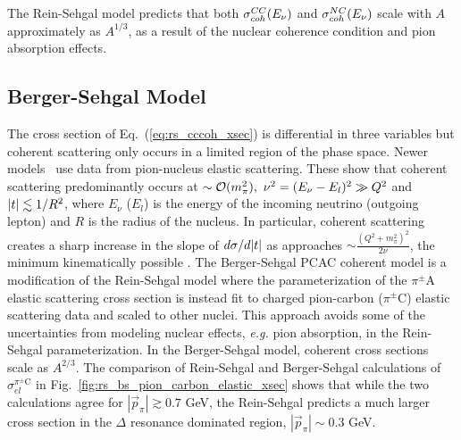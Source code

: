 The Rein-Sehgal model predicts that both $\sigma_{coh}^{CC}(E_{\nu})$ and $\sigma_{coh}^{NC}(E_{\nu})$
scale with $A$ approximately as $A^{1/3}$, as a result of the nuclear coherence condition and pion absorption effects.



\subsection{Berger-Sehgal Model}
\label{sec::Berger-Sehgal}

The cross section of Eq.~(\ref{eq:rs_cccoh_xsec}) is differential in three variables but coherent scattering only occurs in
a limited region of the phase space.  Newer models~\cite{bib:berger_sehgal, bib:kartavtsev, bib:manny} use data from pion-nucleus
elastic scattering.  These show that coherent scattering predominantly occurs at \qsq$\sim\mathcal{O}(m_\pi^2), ~\nu^2 = (E_\nu - E_l)^2 \gg Q^{2}$
and $|t|\lesssim 1/R^2$, where $E_\nu$ ($E_l$) is the energy of the incoming neutrino (outgoing lepton) and $R$ is the radius of the nucleus.
In particular, coherent scattering creates a sharp increase in the slope of $d\sigma/d|t|$ as \tabs approaches
\tmin$\sim \frac{ (Q^2+m_\pi^2)^2}{2\nu}$, the minimum kinematically possible \tabs.
The Berger-Sehgal PCAC coherent model \cite{bib:berger_sehgal} is a modification of the Rein-Sehgal model where the
parameterization of the $\pi^{\pm}$A elastic scattering cross section is instead fit to charged pion-carbon ($\pi^{\pm}$C)
elastic scattering data and scaled to other nuclei.  This approach avoids some of the uncertainties from modeling nuclear effects,
\textit{e.g.} pion absorption, in the Rein-Sehgal parameterization.  In the Berger-Sehgal model, coherent cross sections scale
as $A^{2/3}$.
The comparison of Rein-Sehgal and Berger-Sehgal calculations of $\sigma_{el}^{\pi^{\pm}\text{C}}$ in
Fig.~\ref{fig:rs_bs_pion_carbon_elastic_xsec} shows that while the two calculations agree for $|\vec{p}_{\pi}|\gtrsim0.7$ GeV,
the Rein-Sehgal predicts a much larger cross section in the $\Delta$ resonance dominated region, $|\vec{p}_{\pi}|\sim0.3$ GeV.
